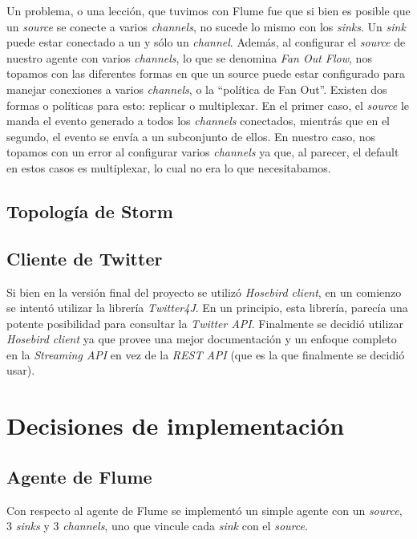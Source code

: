 \documentclass[a4paper,10pt]{article}
\begin{document}
Un problema, o una lección, que tuvimos con Flume fue que si bien es posible que un \textit{source} se conecte a varios \textit{channels}, no sucede lo mismo con los \textit{sinks}.
Un \textit{sink} puede estar conectado a un y sólo un \textit{channel}. Además, al configurar el \textit{source} de nuestro agente con varios \textit{channels}, lo que
se denomina \textit{Fan Out Flow}, nos topamos con las
diferentes formas en que un source puede estar configurado para manejar conexiones a varios \textit{channels}, o la ``política de Fan Out''. Existen dos formas o políticas para esto:
replicar o multiplexar. En el primer caso, el \textit{source} le manda el evento generado a todos los \textit{channels} conectados, mientrás que en el segundo, el evento se envía
a un subconjunto de ellos. En nuestro caso, nos topamos con un error al configurar varios \textit{channels} ya que, al parecer, el default en estos casos es multiplexar, lo cual no
era lo que necesitabamos.

\subsection{Topología de Storm}

\subsection{Cliente de Twitter}

Si bien en la versión final del proyecto se utilizó \textit{Hosebird client}, en un comienzo se intentó utilizar la librería \textit{Twitter4J}. En un principio, esta librería,
parecía una potente posibilidad para consultar la \textit{Twitter API}. Finalmente se decidió utilizar \textit{Hosebird client} ya que provee una mejor documentación y un enfoque
completo en la \textit{Streaming API} en vez de la \textit{REST API} (que es la que finalmente se decidió usar).

\section{Decisiones de implementación}

\subsection{Agente de Flume}
Con respecto al agente de Flume se implementó un simple agente con un \textit{source}, 3 \textit{sinks} y 3 \textit{channels}, uno que vincule cada \textit{sink} con el
\textit{source}.
\end{document}
